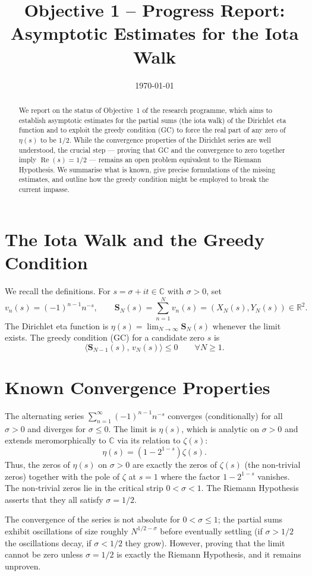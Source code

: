 \documentclass[11pt,a4paper]{article}
\title{\bf Objective 1 -- Progress Report:\\
Asymptotic Estimates for the Iota Walk}
\author{}
\date{\today}
\newcommand{\C}{\mathbb{C}}
\newcommand{\R}{\mathbb{R}}
\newcommand{\RE}{\operatorname{Re}}
\begin{document}
\maketitle

\begin{abstract}
We report on the status of Objective~1 of the research programme, which aims to establish asymptotic estimates for the partial sums (the iota walk) of the Dirichlet eta function and to exploit the greedy condition (GC) to force the real part of any zero of $\eta(s)$ to be $1/2$.  While the convergence properties of the Dirichlet series are well understood, the crucial step --- proving that GC and the convergence to zero together imply $\RE(s)=1/2$ --- remains an open problem equivalent to the Riemann Hypothesis.  We summarise what is known, give precise formulations of the missing estimates, and outline how the greedy condition might be employed to break the current impasse.
\end{abstract}

\section{The Iota Walk and the Greedy Condition}
We recall the definitions.  For $s=\sigma+it\in\C$ with $\sigma>0$, set
\[
v_n(s)=(-1)^{n-1}n^{-s},\qquad 
\mathbf{S}_N(s)=\sum_{n=1}^{N}v_n(s)=(X_N(s),Y_N(s))\in\R^2.
\]
The Dirichlet eta function is $\eta(s)=\lim_{N\to\infty}\mathbf{S}_N(s)$ whenever the limit exists.  The greedy condition (GC) for a candidate zero $s$ is
\[
\langle\mathbf{S}_{N-1}(s),\,v_N(s)\rangle \le 0\qquad\forall N\ge 1.
\]

\section{Known Convergence Properties}
The alternating series $\sum_{n=1}^\infty (-1)^{n-1}n^{-s}$ converges (conditionally) for all $\sigma>0$ and diverges for $\sigma\le 0$.  The limit is $\eta(s)$, which is analytic on $\sigma>0$ and extends meromorphically to $\C$ via its relation to $\zeta(s)$:
\[
\eta(s)=(1-2^{1-s})\zeta(s).
\]
Thus, the zeros of $\eta(s)$ on $\sigma>0$ are exactly the zeros of $\zeta(s)$ (the non‑trivial zeros) together with the pole of $\zeta$ at $s=1$ where the factor $1-2^{1-s}$ vanishes.  The non‑trivial zeros lie in the critical strip $0<\sigma<1$.  The Riemann Hypothesis asserts that they all satisfy $\sigma=1/2$.

The convergence of the series is not absolute for $0<\sigma\le 1$; the partial sums exhibit oscillations of size roughly $N^{1/2-\sigma}$ before eventually settling (if $\sigma>1/2$ the oscillations decay, if $\sigma<1/2$ they grow).  However, proving that the limit cannot be zero unless $\sigma=1/2$ is exactly the Riemann Hypothesis, and it remains unproven.
\end{document}

